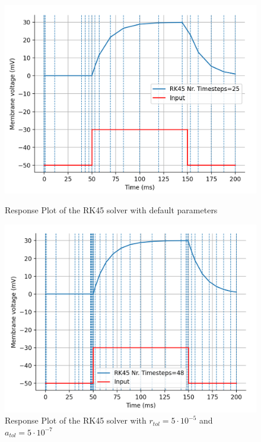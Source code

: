 \documentclass{article}
\begin{document}
    \begin{figure}[htbp]
        \centering
        \begin{minipage}[b]{0.49\textwidth}
            \includegraphics[width=\textwidth]{timestepsRK45.png}
            \caption{Response Plot of the RK45 solver with default parameters}
            \label{fig:timestepsRK45-2}
        \end{minipage}
        \hfill
        \begin{minipage}[b]{0.49\textwidth}
            \includegraphics[width=\textwidth]{RK45_tuned.png}
            \caption{Response Plot of the RK45 solver with $r_{tol} = 5 \cdot 10^{-5}$ and $a_{tol} = 5 \cdot 10^{-7}$}
            \label{fig:RK45_tuned}
        \end{minipage}
    \end{figure}
\end{document}
